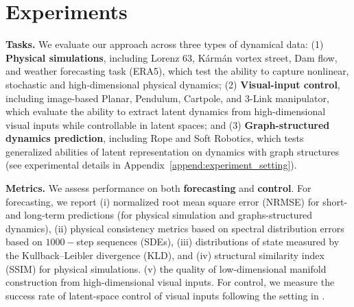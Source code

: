 \documentclass{article} %
\newtheorem{theorem}{Theorem}[section]
\begin{document}

    

\section{Experiments}
\textbf{Tasks.} We evaluate our approach across three types of dynamical data: (1) \textbf{Physical simulations}, including Lorenz 63, Kármán vortex street, Dam flow, and weather forecasting task (ERA5), which test the ability to capture nonlinear, stochastic and high-dimensional physical dynamics; (2) \textbf{Visual-input control}, including image-based Planar, Pendulum, Cartpole, and 3-Link manipulator, which evaluate the ability to extract latent dynamics from high-dimensional visual inputs while controllable in latent spaces; and (3) \textbf{Graph-structured dynamics prediction}, including Rope and Soft Robotics, which tests generalized abilities of latent representation on dynamics with graph structures (see experimental details in Appendix~\ref{append:experiment_setting}). 


\textbf{Metrics.} 
We assess performance on both \textbf{forecasting} and \textbf{control}. 
For forecasting, we report (i) normalized root mean square error (NRMSE) for short- and long-term predictions (for physical simulation and graphs-structured dynamics), 
(ii) physical consistency metrics based on spectral distribution errors based on $1000-$step sequences (SDEs), 
(iii) distributions of state measured by the Kullback–Leibler divergence (KLD), and 
(iv) structural similarity index (SSIM) for physical simulations. 
(v) the quality of low-dimensional manifold construction from high-dimensional visual inputs.
For control, we measure the success rate of latent-space control of visual inputs following the setting in \citep{levine2019prediction}. 
\end{document}
